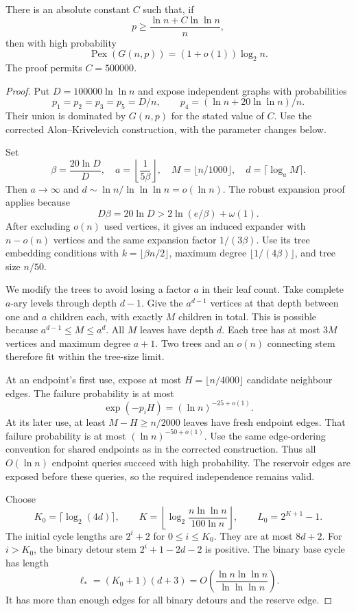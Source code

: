 \begin{theorem}\label{thm:rhost-threshold-retuning}
There is an absolute constant $C$ such that, if
\[
 p\ge\frac{\ln n+C\ln\ln n}{n},
\]
then with high probability
\[
 \operatorname{Pex}(G(n,p))=(1+o(1))\log_2 n.
\]
The proof permits $C=500000$.
\end{theorem}

\begin{proof}
Put $D=100000\ln\ln n$ and expose independent graphs with probabilities
\[
 p_1=p_2=p_3=p_5=D/n,\qquad
 p_4=(\ln n+20\ln\ln n)/n.
\]
Their union is dominated by $G(n,p)$ for the stated value of $C$.
Use the corrected Alon--Krivelevich construction, with the parameter changes below.

Set
\[
 \beta=\frac{20\ln D}{D},\quad
 a=\left\lfloor\frac1{5\beta}\right\rfloor,\quad
 M=\lfloor n/1000\rfloor,\quad
 d=\lceil\log_a M\rceil.
\]
Then $a\to\infty$ and $d\sim\ln n/\ln\ln\ln n=o(\ln n)$.
The robust expansion proof applies because
\[
 D\beta=20\ln D>2\ln(e/\beta)+\omega(1).
\]
After excluding $o(n)$ used vertices, it gives an induced expander with $n-o(n)$ vertices and the same expansion factor $1/(3\beta)$.
Use its tree embedding conditions with $k=\lfloor\beta n/2\rfloor$, maximum degree $\lfloor1/(4\beta)\rfloor$, and tree size $n/50$.

We modify the trees to avoid losing a factor $a$ in their leaf count.
Take complete $a$-ary levels through depth $d-1$.
Give the $a^{d-1}$ vertices at that depth between one and $a$ children each, with exactly $M$ children in total.
This is possible because $a^{d-1}\le M\le a^d$.
All $M$ leaves have depth $d$.
Each tree has at most $3M$ vertices and maximum degree $a+1$.
Two trees and an $o(n)$ connecting stem therefore fit within the tree-size limit.

At an endpoint's first use, expose at most $H=\lfloor n/4000\rfloor$ candidate neighbour edges.
The failure probability is at most
\[
 \exp(-p_iH)=(\ln n)^{-25+o(1)}.
\]
At its later use, at least $M-H\ge n/2000$ leaves have fresh endpoint edges.
That failure probability is at most $(\ln n)^{-50+o(1)}$.
Use the same edge-ordering convention for shared endpoints as in the corrected construction.
Thus all $O(\ln n)$ endpoint queries succeed with high probability.
The reservoir edges are exposed before these queries, so the required independence remains valid.

Choose
\[
 K_0=\lceil\log_2(4d)\rceil,\qquad
 K=\left\lfloor\log_2\frac{n\ln\ln n}{100\ln n}\right\rfloor,
 \qquad L_0=2^{K+1}-1.
\]
The initial cycle lengths are $2^i+2$ for $0\le i\le K_0$.
They are at most $8d+2$.
For $i>K_0$, the binary detour stem $2^i+1-2d-2$ is positive.
The binary base cycle has length
\[
 \ell_*=(K_0+1)(d+3)=O\!\left(\frac{\ln n\ln\ln n}{\ln\ln\ln n}\right).
\]
It has more than enough edges for all binary detours and the reserve edge.


\end{proof}
